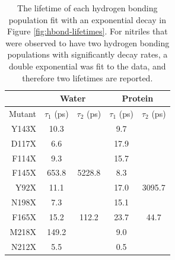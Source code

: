 \begin{table}
    \caption[Estimated lifetimes of hydrogen boniding interactions]{
        The lifetime of each hydrogen bonding population fit with an exponential decay in Figure \ref{fig:hbond-lifetimes}. 
        For nitriles that were observed to have two hydrogen bonding populations with significantly decay rates, a double exponential was fit to the data, and therefore two lifetimes are reported.
    }
    \begin{center}
    \begin{tabular}{r | c c | c c}
    & \multicolumn{2}{c}{Water} & \multicolumn{2}{c}{Protein}\\
    \toprule
        Mutant &  $\tau_1$ (ps)  & $\tau_2$ (ps) &  $\tau_1$ (ps) & $\tau_2$ (ps) \\
    \midrule
    
        Y143X & 10.3  &        & 9.7   &          \\
        D117X & 6.6   &        & 17.9  &          \\
        F114X & 9.3   &        & 15.7  &          \\
        F145X & 653.8 & 5228.8 & 8.3   &          \\
        Y92X  & 11.1  &        & 17.0  & 3095.7   \\
        N198X & 7.3   &        & 15.1  &          \\
        F165X & 15.2  & 112.2  & 23.7  & 44.7     \\
        M218X & 149.2 &        & 9.0   &          \\
        N212X & 5.5   &        & 0.5   &          \\
    
    
    \bottomrule
    \end{tabular}
    \end{center}
    \label{tbl:hbond-lifetimes}
\end{table}

